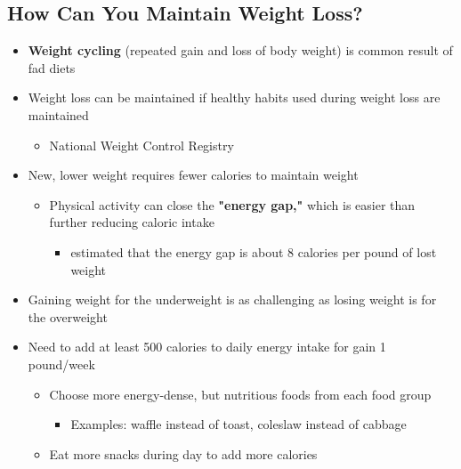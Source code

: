 \documentclass[12pt]{article}
\begin{document}
        \subsection{How Can You Maintain Weight Loss?}
            \begin{itemize}
                \item \textbf{Weight cycling} (repeated gain and loss of body weight) is common result of fad diets
                \item Weight loss can be maintained if healthy habits used during weight loss are maintained
                    \begin{itemize}
                        \item National Weight Control Registry
                    \end{itemize}
                \item New, lower weight requires fewer calories to maintain weight
                    \begin{itemize}
                        \item Physical activity can close the \textbf{"energy gap,"} which is easier than further reducing caloric intake
                            \begin{itemize}
                                \item estimated that the energy gap is about 8 calories per pound of lost weight
                            \end{itemize}
                    \end{itemize}
                \item Gaining weight for the underweight is as challenging as losing weight is for the overweight
                \item Need to add at least 500 calories to daily energy intake for gain 1 pound/week
                    \begin{itemize}
                        \item Choose more energy-dense, but nutritious foods from each food group
                            \begin{itemize}
                                \item Examples: waffle instead of toast, coleslaw instead of cabbage
                            \end{itemize}
                        \item Eat more snacks during day to add more calories
                    \end{itemize}
            \end{itemize}
\end{document}
